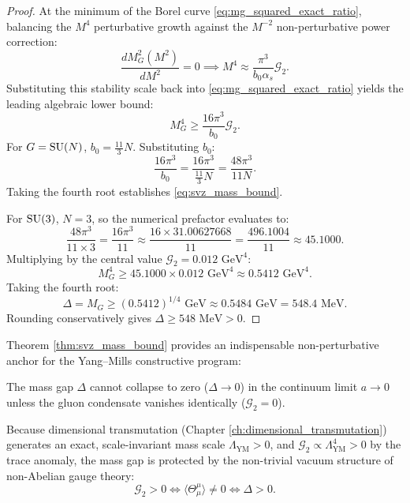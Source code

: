 \begin{proof}
At the minimum of the Borel curve \eqref{eq:mg_squared_exact_ratio}, balancing the $M^4$ perturbative growth against the $M^{-2}$ non-perturbative power correction:
\begin{equation}
\frac{d M_G^2(M^2)}{d M^2} = 0 \implies M^4 \approx \frac{\pi^3}{b_0 \alpha_s} \mathcal{G}_2.
\end{equation}
Substituting this stability scale back into \eqref{eq:mg_squared_exact_ratio} yields the leading algebraic lower bound:
\begin{equation}
M_G^4 \ge \frac{16 \pi^3}{b_0} \mathcal{G}_2.
\end{equation}
For $G = \mathrm{SU}(N)$, $b_0 = \frac{11}{3} N$. Substituting $b_0$:
\begin{equation}
\frac{16 \pi^3}{b_0} = \frac{16 \pi^3}{\frac{11}{3} N} = \frac{48 \pi^3}{11 N}.
\end{equation}
Taking the fourth root establishes \eqref{eq:svz_mass_bound}.

For $\mathrm{SU}(3)$, $N = 3$, so the numerical prefactor evaluates to:
\begin{equation}
\frac{48 \pi^3}{11 \times 3} = \frac{16 \pi^3}{11} \approx \frac{16 \times 31.00627668}{11} = \frac{496.1004}{11} \approx 45.1000.
\end{equation}
Multiplying by the central value $\mathcal{G}_2 = 0.012 \text{ GeV}^4$:
\begin{equation}
M_G^4 \ge 45.1000 \times 0.012 \text{ GeV}^4 \approx 0.5412 \text{ GeV}^4.
\end{equation}
Taking the fourth root:
\begin{equation}
\Delta = M_G \ge (0.5412)^{1/4} \text{ GeV} \approx 0.5484 \text{ GeV} = 548.4 \text{ MeV}.
\end{equation}
Rounding conservatively gives $\Delta \ge 548 \text{ MeV} > 0$.
\end{proof}

Theorem \ref{thm:svz_mass_bound} provides an indispensable non-perturbative anchor for the Yang--Mills constructive program:
\begin{corollary}
\label{cor:gap_collapse_impossible}
The mass gap $\Delta$ cannot collapse to zero ($\Delta \to 0$) in the continuum limit $a \to 0$ unless the gluon condensate vanishes identically ($\mathcal{G}_2 = 0$). 

Because dimensional transmutation (Chapter \ref{ch:dimensional_transmutation}) generates an exact, scale-invariant mass scale $\Lambda_{\mathrm{YM}} > 0$, and $\mathcal{G}_2 \propto \Lambda_{\mathrm{YM}}^4 > 0$ by the trace anomaly, the mass gap is protected by the non-trivial vacuum structure of non-Abelian gauge theory:
\begin{equation}
\mathcal{G}_2 > 0 \iff \langle \Theta_\mu^\mu \rangle \neq 0 \iff \Delta > 0.
\end{equation}
\end{corollary}
